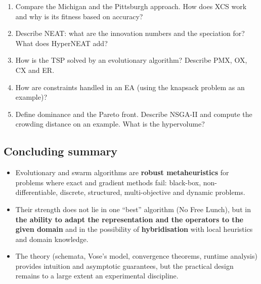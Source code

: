 \documentclass[11pt,a4paper]{article}
\theoremstyle{definition}
\providecommand{\uv}[1]{``#1''}
\begin{document}
\begin{enumerate}
  Baldwinian learning.
\item Compare the Michigan and the Pittsburgh approach. How does XCS work and
  why is its fitness based on accuracy?
\item Describe NEAT: what are the innovation numbers and the speciation for?
  What does HyperNEAT add?
\item How is the TSP solved by an evolutionary algorithm? Describe PMX, OX, CX
  and ER.
\item How are constraints handled in an EA (using the knapsack problem as an
  example)?
\item Define dominance and the Pareto front. Describe NSGA-II and compute the
  crowding distance on an example. What is the hypervolume?
\end{enumerate}

\subsection*{Concluding summary}

\begin{itemize}
\item Evolutionary and swarm algorithms are \textbf{robust metaheuristics} for
  problems where exact and gradient methods fail: black-box, non-differentiable,
  discrete, structured, multi-objective and dynamic problems.
\item Their strength does not lie in one \uv{best} algorithm (No Free Lunch),
  but in \textbf{the ability to adapt the representation and the operators to
  the given domain} and in the possibility of \textbf{hybridisation} with local
  heuristics and domain knowledge.
\item The theory (schemata, Vose's model, convergence theorems, runtime
  analysis) provides intuition and asymptotic guarantees, but the practical
  design remains to a large extent an experimental discipline.
\end{itemize}
\end{document}
